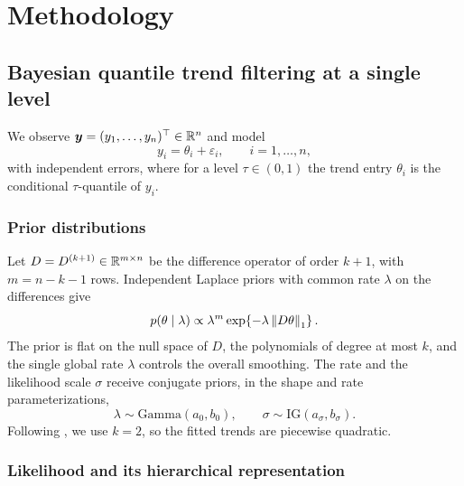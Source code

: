 \section{Methodology}
\label{sec:methodology}

\subsection{Bayesian quantile trend filtering at a single level}
\label{subsec:individual}

We observe $\bm{y} = (y_1, \ldots, y_n)^\top \in \mathbb{R}^n$ and model
\begin{equation}
    y_i = \theta_i + \varepsilon_i, \qquad i = 1, \ldots, n,
    \label{eq:datamodel}
\end{equation}
with independent errors, where for a level $\tau \in (0,1)$ the trend entry $\theta_i$ is the conditional $\tau$-quantile of $y_i$.

\subsubsection{Prior distributions}
\label{subsec:model}

Let $D = D^{(k+1)} \in \mathbb{R}^{m \times n}$ be the difference operator of order $k+1$, with $m = n - k - 1$ rows. Independent Laplace priors with common rate $\lambda$ on the differences give
\begin{equation}
    p(\theta \mid \lambda) \propto \lambda^{m} \exp\!\left\{-\lambda \left\lVert D\theta\right\rVert_1\right\}.
    \label{eq:prior_theta}
\end{equation}
The prior is flat on the null space of $D$, the polynomials of degree at most $k$, and the single global rate $\lambda$ controls the overall smoothing. The rate and the likelihood scale $\sigma$ receive conjugate priors, in the shape and rate parameterizations,
\begin{equation}
    \lambda \sim \mathrm{Gamma}(a_0, b_0), \qquad \sigma \sim \mathrm{IG}(a_\sigma, b_\sigma).
    \label{eq:hyperpriors}
\end{equation}
Following \citet{brantley2020baseline}, we use $k = 2$, so the fitted trends are piecewise quadratic.

\subsubsection{Likelihood and its hierarchical representation}

